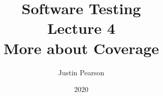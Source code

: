 \documentclass[handout]{beamer}
\title{Software Testing\\ Lecture 4\\ More about Coverage}
\author{Justin Pearson}
\date{2020}
\begin{document}
\lstset{language=C}

\begin{frame}
  \maketitle
\end{frame}

%
\end{document}
